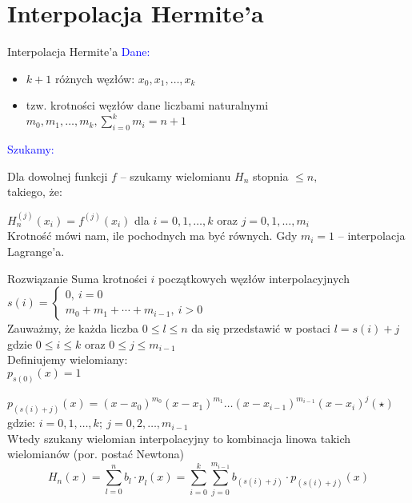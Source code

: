 \section{Interpolacja Hermite'a}


%
\begin{frame}{Interpolacja Hermite'a}
\textcolor{blue}{Dane:}
\begin{itemize}
\item $k+1$ różnych węzłów: $x_{0}, x_{1}, \dots, x_{k}$

\item tzw. krotności węzłów dane liczbami naturalnymi $m_{0}, m_{1},\dots , m_{k}, \displaystyle \sum_{i=0}^{k}m_{i}=n+1$
\end{itemize}
\textcolor{blue}{Szukamy:}

Dla dowolnej funkcji $f$ -- szukamy wielomianu $H_{n}$ stopnia $\leq n,$ \\
takiego, że:

$H_{n}^{(j)}(x_{i})=f^{(j)}(x_{i})$ \quad dla $i=0, 1, \dots , k$ oraz
$j=0, 1, \dots, m_{i}$\\
\vspace{0.5cm}
Krotność mówi nam, ile pochodnych ma być równych.
Gdy $m_{i}=1$ -- interpolacja Lagrange'a.
\end{frame}

\begin{frame}{Rozwiązanie}
Suma krotności $i$ początkowych węzłów interpolacyjnych
\vspace{2mm}
$s(i)=\left\{\begin{array}{l}
0,\ i=0\\
m_{0}+m_{1}+\cdots+m_{i-1},\ i>0
\end{array}\right.$
\vspace{2mm}\\

Zauważmy, że każda liczba 
$0\leq l\leq n$ da się przedstawić w postaci $l=s(i)+j$ gdzie $0 \leq i \leq k$ oraz $0 \leq j \leq m_{i-1}$\\
\vspace{0.5cm}
Definiujemy wielomiany:\\
$p_{s(0)}(x)=1$

$p_{(s(i)+j)}(x)=(x-x_{0})^{m_{0}}(x-x_{1})^{m_{1}}\ldots(x-x_{i-1})^{m_{i-1}}(x-x_{i})^{j}(\star)$ \\
gdzie: $i=0, 1, \dots, k; \: j=0, 2, \dots , m_{i-1}$ \\
Wtedy szukany wielomian interpolacyjny to kombinacja linowa takich wielomianów (por. postać Newtona)
$$
H_{n}(x)=\sum_{l=0}^{n}b_{l}\cdot p_{l}(x)=\sum_{i=0}^{k}\sum_{j=0}^{m_{i-1}}b_{(s(i)+j)}\cdot p_{(s(i)+j)}(x)
$$
\end{frame}


